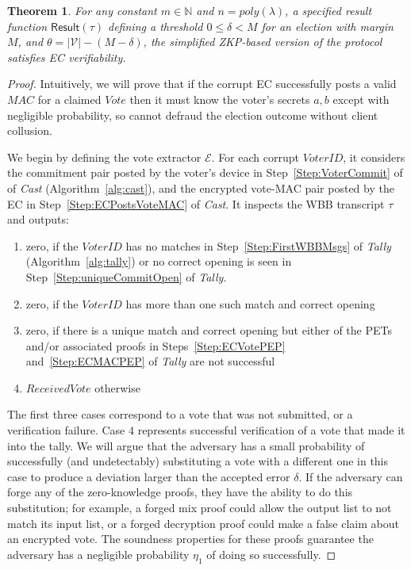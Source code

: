 \documentclass[12pt,a4paper]{article}
\newtheorem{theorem}{Theorem}
\theoremstyle{definition}
\newcommand{\Vote}{\mathit{Vote}}
\newcommand{\ReceivedVote}{\mathit{ReceivedVote}}
\newcommand{\VoterID}{\mathit{VoterID}}
\newcommand{\Mac}{\mathit{MAC}}
\begin{document}
\begin{theorem}\label{thm:ec-ver}
    For any constant $m\in\mathbb{N}$ and $n=poly(\lambda)$, a specified result function $\mathsf{Result}(\tau)$ defining a threshold $0 \leq \delta < M$ for an election with margin $M$, and $\theta=|\mathcal{V}|-(M-\delta)$, the simplified ZKP-based version of the protocol satisfies EC verifiability.
\end{theorem}
\begin{proof}
    Intuitively, we will prove that if the corrupt EC successfully posts a valid $\Mac$ for a claimed $\Vote$ then it must know the voter's secrets $a, b$ except with negligible probability, so cannot defraud the election outcome without client collusion.

    We begin by defining the vote extractor $\mathcal{E}$. For each corrupt $\VoterID$, it considers the commitment pair posted by the voter's device in Step~\ref{Step:VoterCommit} of of \textit{Cast} (Algorithm~\ref{alg:cast}), and the encrypted vote-MAC pair posted by the EC in Step~\ref{Step:ECPostsVoteMAC} of \textit{Cast}. It inspects the WBB transcript $\tau$ and outputs:
    \begin{enumerate}
        \item zero, if the $\VoterID$ has no matches in Step~\ref{Step:FirstWBBMsgs} of \textit{Tally} (Algorithm~\ref{alg:tally}) or no correct opening is seen in Step~\ref{Step:uniqueCommitOpen} of \textit{Tally}.
        \item zero, if the $\VoterID$ has more than one such match and correct opening
        \item zero, if there is a unique match and correct opening but either of the PETs and/or associated proofs in Steps~\ref{Step:ECVotePEP} and~\ref{Step:ECMACPEP} of \textit{Tally} are not successful
        \item $\ReceivedVote$ otherwise
    \end{enumerate}

    The first three cases correspond to a vote that was not submitted, or a verification failure. Case 4 represents successful verification of a vote that made it into the tally. We will argue that the adversary has a small probability of successfully (and undetectably) substituting a vote with a different one in this case to produce a deviation larger than the accepted error $\delta$. If the adversary can forge any of the zero-knowledge proofs, they have the ability to do this substitution; for example, a forged mix proof could allow the output list to not match its input list, or a forged decryption proof could make a false claim about an encrypted vote. The soundness properties for these proofs guarantee the adversary has a negligible probability $\eta_1$ of doing so successfully.


\end{proof}
\end{document}
